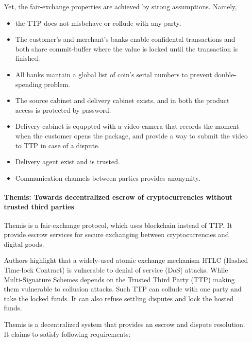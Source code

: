 \documentclass{ieeeaccess}
\begin{document}
Yet, the fair-exchange properties are achieved by strong assumptions.
Namely,

\begin{itemize}
    \item the TTP does not misbehave or collude with any party. 
    \item The customer's and merchant's banks enable confidental transactions and both share commit-buffer where the value is locked until the transaction is finished.   
    \item All banks mantain a global list of coin's serial numbers to prevent double-spending problem. 
    \item The source cabinet and delivery cabinet exists, and in both the product access is protected by password.
    \item Delivery cabinet is equppted with a video camera that records the moment when the customer opens the package, and provide a way to submit the video to TTP in case of a dispute. 
    \item Delivery agent exist and is trusted. 
    \item Communication channels between parties provides anonymity.
\end{itemize}

\paragraph{Themis: Towards decentralized escrow of cryptocurrencies
without trusted third
parties}\label{themis-towards-decentralized-escrow-of-cryptocurrencies-without-trusted-third-parties}

Themis\cite{meng2019themis} is a fair-exchange
protocol, which uses blockchain instead of TTP. It provide escrow
services for secure exchanging between cryptocurrencies and digital
goods.

Authors highlight that a widely-used atomic exchange mechanism HTLC
(Hashed Time-lock Contract) is vulnerable to denial of service (DoS)
attacks. While Multi-Signature Schemes depends on the Trusted Third
Party (TTP) making them vulnerable to collusion attacks. Such TTP can
collude with one party and take the locked funds. It can also refuse
settling disputes and lock the hosted funds.

Themis is a decentralized system that provides an escrow and dispute
resolution. It claims to satisfy following requirements:
\end{document}
